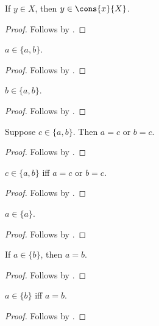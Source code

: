 \begin{proposition}\label{cons_right}
    If $y\in X$, then $y\in \cons{x}{X}$.
\end{proposition}
\begin{proof}
    Follows by .
\end{proof}



\begin{proposition}\label{upair_intro_left}
    $a\in\{a,b\}$.
\end{proposition}
\begin{proof}
    Follows by .
\end{proof}

\begin{proposition}\label{upair_intro_right}
    $b\in\{a,b\}$.
\end{proposition}
\begin{proof}
    Follows by .
\end{proof}

\begin{proposition}\label{upair_elim}
    Suppose $c\in\{a,b\}$. Then $a = c$ or $b = c$.
\end{proposition}
\begin{proof}
    Follows by .
\end{proof}

\begin{proposition}\label{upair_iff}
    $c\in\{a,b\}$ iff $a = c$ or $b = c$.
\end{proposition}
\begin{proof}
    Follows by .
\end{proof}



\begin{proposition}\label{singleton_intro}
    $a\in\{a\}$.
\end{proposition}
\begin{proof}
    Follows by .
\end{proof}

\begin{proposition}\label{singleton_elim}
    If $a\in\{b\}$, then $a = b$.
\end{proposition}
\begin{proof}
    Follows by .
\end{proof}

\begin{proposition}\label{singleton_iff}
    $a\in\{b\}$ iff $a = b$.
\end{proposition}
\begin{proof}
    Follows by .
\end{proof}

